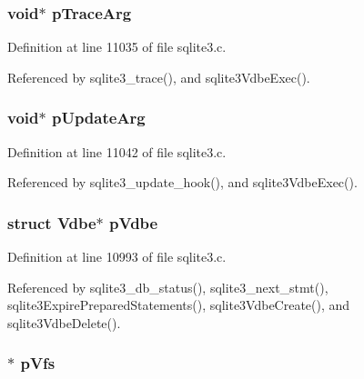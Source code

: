 \subsubsection[{p\+Trace\+Arg}]{\setlength{\rightskip}{0pt plus 5cm}void$\ast$ p\+Trace\+Arg}\label{structsqlite3_aba68a77cf29ce08cacb16f81a5e4211b}


Definition at line 11035 of file sqlite3.\+c.



Referenced by sqlite3\+\_\+trace(), and sqlite3\+Vdbe\+Exec().

\hypertarget{structsqlite3_af3c38d0b39a40a6391029bda3724102e}{}
\subsubsection[{p\+Update\+Arg}]{\setlength{\rightskip}{0pt plus 5cm}void$\ast$ p\+Update\+Arg}\label{structsqlite3_af3c38d0b39a40a6391029bda3724102e}


Definition at line 11042 of file sqlite3.\+c.



Referenced by sqlite3\+\_\+update\+\_\+hook(), and sqlite3\+Vdbe\+Exec().

\hypertarget{structsqlite3_a9e1e699c9d057bec04b2713e4c38c1e8}{}
\subsubsection[{p\+Vdbe}]{\setlength{\rightskip}{0pt plus 5cm}struct {\bf Vdbe}$\ast$ p\+Vdbe}\label{structsqlite3_a9e1e699c9d057bec04b2713e4c38c1e8}


Definition at line 10993 of file sqlite3.\+c.



Referenced by sqlite3\+\_\+db\+\_\+status(), sqlite3\+\_\+next\+\_\+stmt(), sqlite3\+Expire\+Prepared\+Statements(), sqlite3\+Vdbe\+Create(), and sqlite3\+Vdbe\+Delete().

\hypertarget{structsqlite3_a59603ca1cedf2bda0ee4e65eb610a0b5}{}
\subsubsection[{p\+Vfs}]{$\ast$ p\+Vfs}\label{structsqlite3_a59603ca1cedf2bda0ee4e65eb610a0b5}


